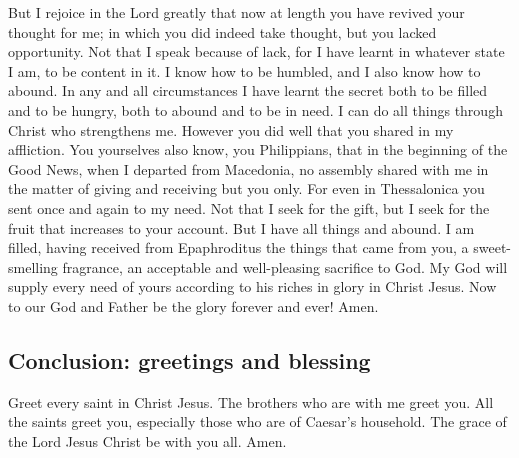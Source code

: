  But I rejoice in the Lord greatly that now at length you
have revived your thought for me; in which you did indeed take thought,
but you lacked opportunity.  Not that I speak because of
lack, for I have learnt in whatever state I am, to be content in it.
 I know how to be humbled, and I also know how to abound.
In any and all circumstances I have learnt the secret both to be filled
and to be hungry, both to abound and to be in need.  I
can do all things through Christ who strengthens me. 
However you did well that you shared in my affliction. 
You yourselves also know, you Philippians, that in the beginning of the
Good News, when I departed from Macedonia, no assembly shared with me in
the matter of giving and receiving but you only.  For
even in Thessalonica you sent once and again to my need. 
Not that I seek for the gift, but I seek for the fruit that increases to
your account.  But I have all things and abound. I am
filled, having received from Epaphroditus the things that came from you,
a sweet-smelling fragrance, an acceptable and well-pleasing sacrifice to
God.  My God will supply every need of yours according to
his riches in glory in Christ Jesus.  Now to our God and
Father be the glory forever and ever! Amen.

\hypertarget{conclusion-greetings-and-blessing}{%
\subsection{Conclusion: greetings and
blessing}\label{conclusion-greetings-and-blessing}}

 Greet every saint in Christ Jesus. The brothers who are
with me greet you.  All the saints greet you, especially
those who are of Caesar's household.  The grace of the
Lord Jesus Christ be with you all. Amen.
